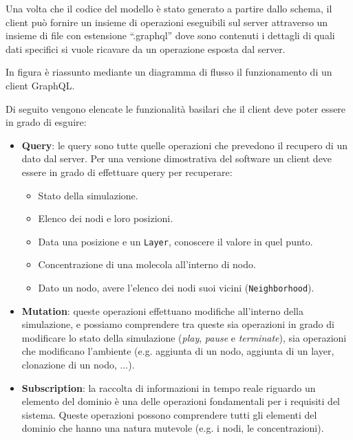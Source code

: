 Una volta che il codice del modello è stato generato a partire dallo schema, il client può fornire un insieme di operazioni eseguibili sul server attraverso
un insieme di file con estensione ``.graphql'' dove sono contenuti i dettagli di quali dati specifici si vuole ricavare da un operazione esposta dal server.

In figura  è riassunto mediante un diagramma di flusso il funzionamento di un client GraphQL.

Di seguito vengono elencate le funzionalità basilari che il client deve poter essere in grado di esguire:
\begin{itemize}
    \item \textbf{Query}: le query sono tutte quelle operazioni che prevedono il recupero di un dato dal server. Per una versione dimostrativa del software
        un client deve essere in grado di effettuare query per recuperare:
        \begin{itemize}
            \item Stato della simulazione.
            \item Elenco dei nodi e loro posizioni.
            \item Data una posizione e un \texttt{Layer}, conoscere il valore in quel punto.
            \item Concentrazione di una molecola all'interno di nodo.
            \item Dato un nodo, avere l'elenco dei nodi suoi vicini (\texttt{Neighborhood}).
        \end{itemize}
    \item \textbf{Mutation}: queste operazioni effettuano modifiche all'interno della simulazione, e possiamo comprendere tra queste sia operazioni
        in grado di modificare lo stato della simulazione (\textit{play}, \textit{pause} e \textit{terminate}), sia operazioni che modificano l'ambiente
        (e.g. aggiunta di un nodo, aggiunta di un layer, clonazione di un nodo, ...).
    \item \textbf{Subscription}: la raccolta di informazioni in tempo reale riguardo un elemento del dominio è una delle operazioni fondamentali per i
        requisiti del sistema. Queste operazioni possono comprendere tutti gli elementi del dominio che hanno una natura mutevole (e.g. i nodi, le concentrazioni).
\end{itemize}

